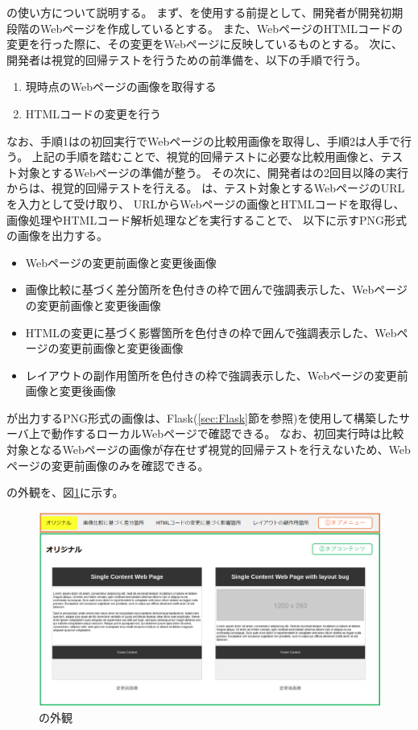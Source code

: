 \toolName の使い方について説明する。
まず、\toolName を使用する前提として、開発者が開発初期段階のWebページを作成しているとする。
また、WebページのHTMLコードの変更を行った際に、その変更をWebページに反映しているものとする。
次に、開発者は視覚的回帰テストを行うための前準備を、以下の手順で行う。
\begin{enumerate}
    \item 現時点のWebページの画像を取得する
    \item HTMLコードの変更を行う
\end{enumerate}
なお、手順1は\toolName の初回実行でWebページの比較用画像を取得し、手順2は人手で行う。
上記の手順を踏むことで、視覚的回帰テストに必要な比較用画像と、テスト対象とするWebページの準備が整う。
その次に、開発者は\toolName の2回目以降の実行からは、視覚的回帰テストを行える。
\toolName は、テスト対象とするWebページのURLを入力として受け取り、
URLからWebページの画像とHTMLコードを取得し、
画像処理やHTMLコード解析処理などを実行することで、
以下に示すPNG形式の画像を出力する。
\begin{itemize}
    \item Webページの変更前画像と変更後画像
    \item 画像比較に基づく差分箇所を色付きの枠で囲んで強調表示した、Webページの変更前画像と変更後画像
    \item HTMLの変更に基づく影響箇所を色付きの枠で囲んで強調表示した、Webページの変更前画像と変更後画像
    \item レイアウトの副作用箇所を色付きの枠で強調表示した、Webページの変更前画像と変更後画像
\end{itemize}
\toolName が出力するPNG形式の画像は、Flask(\ref{sec:Flask}節を参照)を使用して構築したサーバ上で動作するローカルWebページで確認できる。
なお、\toolName 初回実行時は比較対象となるWebページの画像が存在せず視覚的回帰テストを行えないため、Webページの変更前画像のみを確認できる。
\par
\toolName の外観を、図\ref{fig: Appearance}に示す。
\begin{figure}[tp]
    \begin{center}
        \includegraphics[width=1.0\columnwidth]{image/3_Appearance.png}
        \caption{\toolName の外観}
        \label{fig: Appearance}
    \end{center}
\end{figure}

